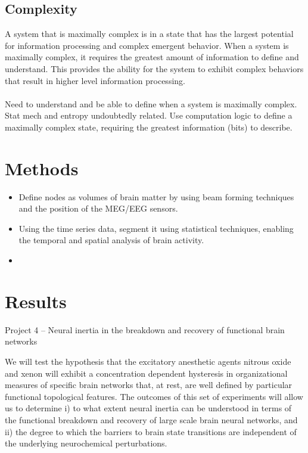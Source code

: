 \documentclass{article}
\begin{document}
\subsection{Complexity}
A system that is maximally complex is in a state that has the largest potential for information processing and complex emergent behavior. When a system is maximally complex, it requires the greatest amount of information to define and understand. This provides the ability for the system to exhibit complex behaviors that result in higher level information processing.
\\
\\
Need to understand and be able to define when a system is maximally complex. Stat mech and entropy undoubtedly related. Use computation logic to define a maximally complex state, requiring the greatest information (bits) to describe.
\section{Methods}

\begin{itemize}
\item Define nodes as volumes of brain matter by using beam forming techniques and the position of the MEG/EEG sensors.
\item Using the time series data, segment it using statistical techniques, enabling the temporal and spatial analysis of brain activity.
\item 
\end{itemize}

\section{Results}
Project 4 – Neural inertia in the breakdown and recovery of functional brain networks

We will test the hypothesis that the excitatory anesthetic agents nitrous oxide and xenon will exhibit a concentration dependent hysteresis in organizational measures of specific brain networks that, at rest, are well defined by particular functional topological features.  The outcomes of this set of experiments will allow us to determine i) to what extent neural inertia can be understood in terms of the functional breakdown and recovery of large scale brain neural networks, and ii) the degree to which the barriers to brain state transitions are independent of the underlying neurochemical perturbations.
\end{document}
